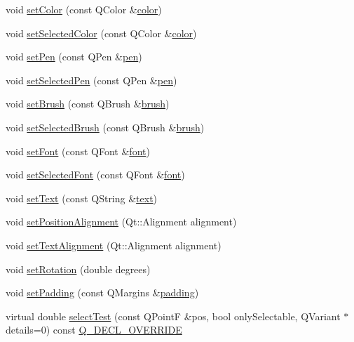 \begin{DoxyCompactItemize}
void \hyperlink{class_q_c_p_item_text_aa51efc0841fe52da9eaf8aff6fc8a8b2}{set\+Color} (const Q\+Color \&\hyperlink{class_q_c_p_item_text_ac9cb0a8a27f64d1b40855910ea9ebd03}{color})
\item 
void \hyperlink{class_q_c_p_item_text_ae7ba0bdb75c897b028388e45bfd435fa}{set\+Selected\+Color} (const Q\+Color \&\hyperlink{class_q_c_p_item_text_ac9cb0a8a27f64d1b40855910ea9ebd03}{color})
\item 
void \hyperlink{class_q_c_p_item_text_a9b9ec6eea0eb0603977ff84d4c78d0a3}{set\+Pen} (const Q\+Pen \&\hyperlink{class_q_c_p_item_text_a552bd02f46dbcb4b4812559036893352}{pen})
\item 
void \hyperlink{class_q_c_p_item_text_a291febe586f0da3f1c392e77bef4aa20}{set\+Selected\+Pen} (const Q\+Pen \&\hyperlink{class_q_c_p_item_text_a552bd02f46dbcb4b4812559036893352}{pen})
\item 
void \hyperlink{class_q_c_p_item_text_a1c7e131516df2ed8d941ef31240ded8e}{set\+Brush} (const Q\+Brush \&\hyperlink{class_q_c_p_item_text_a38b981dfacb703efa8e27346eebcb5a2}{brush})
\item 
void \hyperlink{class_q_c_p_item_text_a6b8377eeb2af75eb9528422671ac16cb}{set\+Selected\+Brush} (const Q\+Brush \&\hyperlink{class_q_c_p_item_text_a38b981dfacb703efa8e27346eebcb5a2}{brush})
\item 
void \hyperlink{class_q_c_p_item_text_a94ad60ebe04f5c07c35e7c2029e96b1f}{set\+Font} (const Q\+Font \&\hyperlink{class_q_c_p_item_text_ad34943fd68a9b1451d3e3234d072e418}{font})
\item 
void \hyperlink{class_q_c_p_item_text_a0be2841772f83663c4db307928b82816}{set\+Selected\+Font} (const Q\+Font \&\hyperlink{class_q_c_p_item_text_ad34943fd68a9b1451d3e3234d072e418}{font})
\item 
void \hyperlink{class_q_c_p_item_text_a3dacdda0ac88f99a05b333b977c48747}{set\+Text} (const Q\+String \&\hyperlink{class_q_c_p_item_text_a9547f7832010486abed0837e75db5330}{text})
\item 
void \hyperlink{class_q_c_p_item_text_a781cdf8c640fc6a055dcff1e675c8c7a}{set\+Position\+Alignment} (Qt\+::\+Alignment alignment)
\item 
void \hyperlink{class_q_c_p_item_text_ab5bc0684c4d1bed81949a11b34dba478}{set\+Text\+Alignment} (Qt\+::\+Alignment alignment)
\item 
void \hyperlink{class_q_c_p_item_text_a4bcc10cd97952c3f749d75824b5077f0}{set\+Rotation} (double degrees)
\item 
void \hyperlink{class_q_c_p_item_text_aeea8a3e01f135f9dd0bb08f51db66310}{set\+Padding} (const Q\+Margins \&\hyperlink{class_q_c_p_item_text_a00e0fa03822ff384bf4921c1c90322ff}{padding})
\item 
virtual double \hyperlink{class_q_c_p_item_text_a676aaec10ad3cc4d7d0e4847db04c838}{select\+Test} (const Q\+PointF \&pos, bool only\+Selectable, Q\+Variant $\ast$details=0) const \hyperlink{qcustomplot_8hh_a42cc5eaeb25b85f8b52d2a4b94c56f55}{Q\+\_\+\+D\+E\+C\+L\+\_\+\+O\+V\+E\+R\+R\+I\+DE}
\end{DoxyCompactItemize}
